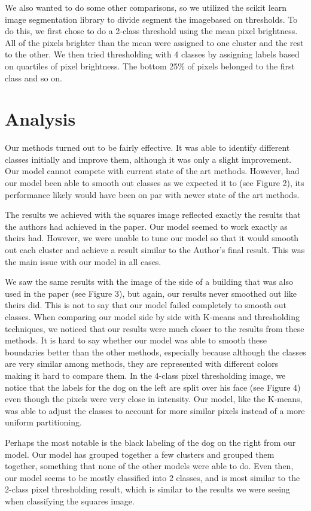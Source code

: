 \documentclass[11pt]{article}
\begin{document}
We also wanted to do some other comparisons, so we utilized the scikit learn image segmentation library to divide segment the imagebased on thresholds.
To do this, we first chose to do a 2-class threshold using the mean pixel brightness.
All of the pixels brighter than the mean were assigned to one cluster and the rest to the other.
We then tried thresholding with 4 classes by assigning labels based on quartiles of pixel brightness.
The bottom 25\% of pixels belonged to the first class and so on.


\section{Analysis}
Our methods turned out to be fairly effective.
It was able to identify different classes initially and improve them, although it was only a slight improvement.
Our model cannot compete with current state of the art methods.
However, had our model been able to smooth out classes as we expected it to (see Figure 2), its performance likely would have been on par with newer state of the art methods.

The results we achieved with the squares image reflected exactly the results that the authors had achieved in the paper.
Our model seemed to work exactly as theirs had.
However, we were unable to tune our model so that it would smooth out each cluster and achieve a result similar to the Author's final result.
This was the main issue with our model in all cases.

We saw the same results with the image of the side of a building that was also used in the paper (see Figure 3), but again, our results never smoothed out like theirs did.
This is not to say that our model failed completely to smooth out classes.
When comparing our model side by side with K-means and thresholding techniques, we noticed that our results were much closer to the results from these methods.
It is hard to say whether our model was able to smooth these boundaries better than the other methods, especially because although the classes are very similar among methods, they are represented with different colors making it hard to compare them.
In the 4-class pixel thresholding image, we notice that the labels for the dog on the left are split over his face (see Figure 4) even though the pixels were very close in intensity.
Our model, like the K-means, was able to adjust the classes to account for more similar pixels instead of a more uniform partitioning.

Perhaps the most notable is the black labeling of the dog on the right from our model.
Our model has grouped together a few clusters and grouped them together, something that none of the other models were able to do.
Even then, our model seems to be mostly classified into 2 classes, and is most similar to the 2-class pixel thresholding result, which is similar to the results we were seeing when classifying the squares image.
\end{document}
